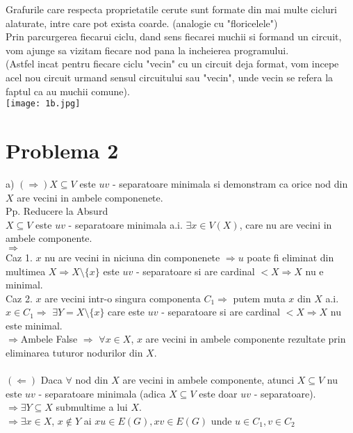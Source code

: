 \documentclass{article}
\begin{document}
Grafurile care respecta proprietatile cerute sunt formate din mai multe cicluri alaturate, intre care pot exista coarde. (analogie cu "floricelele")\\
Prin parcurgerea fiecarui ciclu, dand sens fiecarei muchii si formand un circuit, vom ajunge sa vizitam fiecare nod pana la incheierea programului.\\
(Astfel incat pentru fiecare ciclu "vecin" cu un circuit deja format, vom incepe acel nou circuit urmand sensul circuitului sau "vecin", unde vecin se refera la faptul ca au muchii comune).\\

\texttt{[image: 1b.jpg]}
\newpage
\section*{Problema 2}
\Large
a) $(\Rightarrow) X\subseteq V$ este $uv$ - separatoare minimala si demonstram ca orice nod din $X$ are vecini in ambele componenete.
\bigskip\\
Pp. Reducere la Absurd\\
$X\subseteq V$ este $uv$ - separatoare minimala a.i. $\exists x\in V(X)$, care nu are vecini in ambele componente.\\
$\Rightarrow$\\
Caz 1. $x$ nu are vecini in niciuna din componenete $\Rightarrow u$ poate fi eliminat din multimea $X \Rightarrow X\setminus \{ x\}$ este $uv$ - separatoare si are cardinal $<X \Rightarrow X$ nu e minimal.\\
Caz 2. $x$ are vecini intr-o singura componenta $C_{1} \Rightarrow$ putem muta $x$ din $X$ a.i. $ x\in C_{1}\Rightarrow$ $ \exists Y=X\setminus \{ x\}$ care este $uv$ - separatoare si are cardinal $< X\Rightarrow X$ nu este minimal.
\bigskip\\
$\Rightarrow$Ambele False $\Rightarrow$ $\forall x\in X $, $x$ are vecini in ambele componente rezultate prin eliminarea tuturor nodurilor din $X$.\\
\bigskip\\

 $(\Leftarrow)$ Daca $\forall$ nod din $X$ are vecini in ambele componente, atunci $X\subseteq V$ nu este $uv$ - separatoare minimala (adica $X\subseteq V$ este doar $uv$ - separatoare).
   \smallskip\\
 $\Rightarrow \exists Y \subseteq X$ submultime a lui $X$.\\
 $\Rightarrow \exists x\in X$, $x \notin Y$ ai $xu\in E(G), xv\in E(G)$ unde $u\in C_{1}, v\in C_{2} $\\
\end{document}
